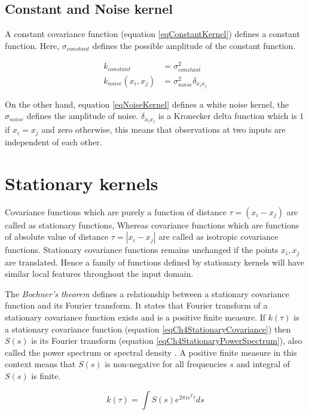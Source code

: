\subsection{Constant and Noise kernel}
A constant covariance function (equation \ref{eqConstantKernel}) defines a constant function. Here, $\sigma_{constant}$ defines the possible amplitude of the constant function.

\begin{align}
k_{constant} & = \sigma^2_{constant} \label{eqConstantKernel} \\
k_{noise}(x_{i}, x_{j}) & = \sigma^2_{noise}\delta_{x_{i}x_{j}} \label{eqNoiseKernel}
\end{align}

On the other hand, equation \ref{eqNoiseKernel} defines a white noise kernel, the $\sigma_{noise}$ defines the amplitude of noise. $\delta_{x_{i}x_{j}}$ is a Kronecker delta function which is $1$ if $x_{i} = x_{j}$ and zero otherwise, this means that observations at two inputs are independent of each other. 

\section{Stationary kernels} \label{secStationaryKernels}
Covariance functions which are purely a function of distance $\tau = (x_{i} - x_{j})$ are called as stationary functions, Whereas covariance functions which are functions of absolute value of distance $\tau = |x_{i} - x_{j}|$ are called as isotropic covariance functions. Stationary covariance functions remains unchanged if the points $x_{i}, x_{j}$ are translated. Hence a family of functions defined by stationary kernels will have similar local features throughout the input domain. 

The \textit{Bochner's theorem} defines a relationship between a stationary covariance function and its Fourier transform. It states that Fourier transform of a stationary covariance function exists and is a positive finite measure. If $k(\tau)$ is a stationary covariance function (equation \ref{eqCh4StationaryCovariance}) then $S(s)$ is its Fourier transform (equation \ref{eqCh4StationaryPowerSpectrum}), also called the power spectrum or spectral density \cite{bochner1959lectures, Stein1999Springer, cox1977theory}. A positive finite measure in this context means that $S(s)$ is non-negative for all frequencies $s$ and integral of $S(s)$ is finite.

\begin{equation}\label{eqCh4StationaryCovariance}
    k(\tau) = \int S(s) e^{2 \pi is^{T} \tau}ds
\end{equation}

